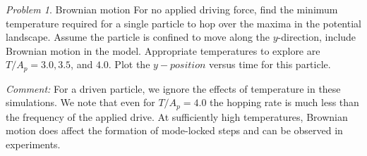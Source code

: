 \documentclass[preprint,showpacs,preprintnumbers,amsmath,amssymb,aps,prb]{revtex4-1}
\theoremstyle{remark}
\newtheorem{problem}{Problem}
\begin{document}
\begin{problem}{Brownian motion}
  For no applied driving force,
  find 
  the minimum temperature required for a single particle
  to hop over the maxima in the potential landscape.
  Assume the particle is confined to
  move along the $y$-direction,
  include Brownian motion 
  in the model.
  Appropriate temperatures to explore
  are $T/A_p = 3.0, 3.5$, and $4.0$.
  Plot the $y-position$ versus time
  for this particle.
%  

  {\it Comment: } For a driven particle,
  we ignore 
  the effects of temperature 
  in these simulations.  
  We note that even for $T/A_p = 4.0$ 
  the hopping rate
  is much less than the
  frequency of the applied drive. %
  At sufficiently high temperatures,
  Brownian motion does affect 
  the formation of mode-locked steps
  and can be observed in experiments.
\end{problem}
\end{document}

